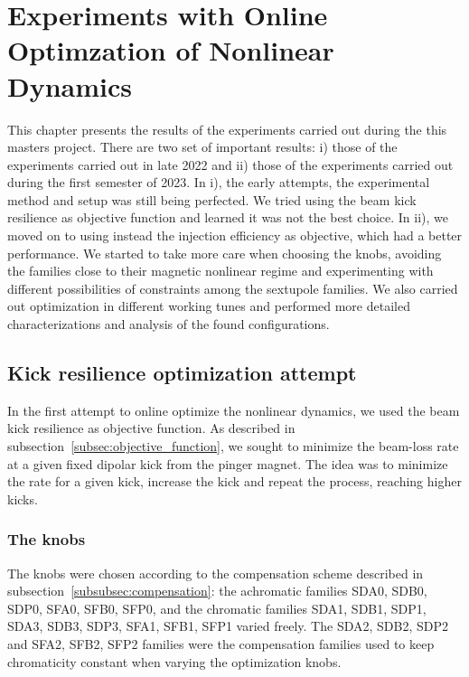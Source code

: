 \chapter{Experiments with Online Optimzation of Nonlinear Dynamics}
This chapter presents the results of the experiments carried out during the this masters project. There are two set of important results: i) those of the experiments carried out in late 2022 and ii) those of the experiments carried out during the first semester of 2023. In i), the early attempts, the experimental method and setup was still being perfected. We tried using the beam kick resilience as objective function and learned it was not the best choice. In ii), we moved on to using instead the injection efficiency as objective, which had a better performance.  We started to take more care when choosing the knobs, avoiding the families close to their magnetic nonlinear regime and experimenting with different possibilities of constraints among the sextupole families. We also carried out optimization in different working tunes and performed more detailed characterizations and analysis of the found configurations.
\section{Kick resilience optimization attempt}
In the first attempt to online optimize the nonlinear dynamics, we used the beam kick resilience as objective function. As described in subsection~\ref{subsec:objective_function}, we sought to minimize the beam-loss rate at a given fixed dipolar kick from the pinger magnet. The idea was to minimize the rate for a given kick, increase the kick and repeat the process, reaching higher kicks.
\subsection{The knobs}
The knobs were chosen according to the compensation scheme described in subsection~\ref{subsubsec:compensation}: the achromatic families SDA0, SDB0, SDP0, SFA0, SFB0, SFP0, and the chromatic families SDA1, SDB1, SDP1, SDA3, SDB3, SDP3, SFA1, SFB1, SFP1 varied freely. The SDA2, SDB2, SDP2 and SFA2, SFB2, SFP2 families were the compensation families used to keep chromaticity constant when varying the optimization knobs.
